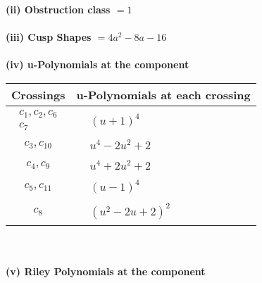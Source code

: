 \documentclass[1p]{elsarticle_modified}
\theoremstyle{definition}
\begin{document}
\flushleft \textbf{(ii) Obstruction class $= 1$}\\~\\
\flushleft \textbf{(iii) Cusp Shapes $= 4 a^2-8 a-16$}\\~\\
\newpage\renewcommand{\arraystretch}{1}
\flushleft \textbf{(iv) u-Polynomials at the component}\newline \\
\begin{tabular}{m{50pt}|m{274pt}}
Crossings & \hspace{64pt}u-Polynomials at each crossing \\
\hline $$\begin{aligned}c_{1},c_{2},c_{6}\\c_{7}\end{aligned}$$&$\begin{aligned}
&(u+1)^4
\end{aligned}$\\
\hline $$\begin{aligned}c_{3},c_{10}\end{aligned}$$&$\begin{aligned}
&u^4-2 u^2+2
\end{aligned}$\\
\hline $$\begin{aligned}c_{4},c_{9}\end{aligned}$$&$\begin{aligned}
&u^4+2 u^2+2
\end{aligned}$\\
\hline $$\begin{aligned}c_{5},c_{11}\end{aligned}$$&$\begin{aligned}
&(u-1)^4
\end{aligned}$\\
\hline $$\begin{aligned}c_{8}\end{aligned}$$&$\begin{aligned}
&(u^2-2 u+2)^2
\end{aligned}$\\
\hline
\end{tabular}\\~\\
\newpage\renewcommand{\arraystretch}{1}
\flushleft \textbf{(v) Riley Polynomials at the component}\newline \\
\end{document}
